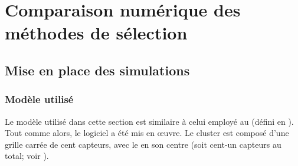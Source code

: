\section{Comparaison numérique des méthodes de sélection}

    \subsection{Mise en place des simulations}

        \subsubsection{Modèle utilisé}

Le modèle utilisé dans cette section est similaire à celui employé au  (défini en ).
Tout comme alors, le logiciel \nsii a été mis en œuvre.
Le cluster est composé d'une grille carrée de cent capteurs, avec le \ch en son centre (soit cent-un capteurs au total; voir ).

